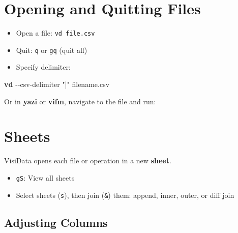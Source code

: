 \documentclass[
  letterpaper,
  DIV=11,
  numbers=noendperiod]{scrartcl}
\newenvironment{Shaded}{}{}
\newcommand{\AttributeTok}[1]{\textcolor[rgb]{0.65,0.15,0.64}{#1}}
\newcommand{\BuiltInTok}[1]{\textcolor[rgb]{0.65,0.15,0.64}{#1}}
\newcommand{\CommentTok}[1]{\textcolor[rgb]{0.63,0.63,0.65}{\textit{#1}}}
\newcommand{\ExtensionTok}[1]{\textcolor[rgb]{0.25,0.47,0.95}{\textbf{#1}}}
\newcommand{\NormalTok}[1]{\textcolor[rgb]{0.22,0.23,0.26}{#1}}
\newcommand{\StringTok}[1]{\textcolor[rgb]{0.31,0.63,0.31}{#1}}
\newcommand{\VariableTok}[1]{\textcolor[rgb]{0.89,0.34,0.29}{#1}}
\providecommand{\tightlist}{%
  \setlength{\itemsep}{0pt}\setlength{\parskip}{0pt}}\usepackage{longtable,booktabs,array}
\begin{document}
\section{Opening and Quitting Files}\label{opening-and-quitting-files}

\begin{itemize}
\tightlist
\item
  Open a file: \texttt{vd\ file.csv}
\item
  Quit: \texttt{q} or \texttt{gq} (quit all)
\item
  Specify delimiter:
\end{itemize}

\begin{Shaded}
\begin{Highlighting}[]
\ExtensionTok{vd} \AttributeTok{{-}{-}csv{-}delimiter} \StringTok{"|"}\NormalTok{ filename.csv}
\end{Highlighting}
\end{Shaded}

Or in \textbf{yazi} or \textbf{vifm}, navigate to the file and run:

\begin{Shaded}
\end{Shaded}

\section{Sheets}\label{sheets}

VisiData opens each file or operation in a new \textbf{sheet}.

\begin{itemize}
\tightlist
\item
  \texttt{gS}: View all sheets
\item
  Select sheets (\texttt{s}), then join (\texttt{\&}) them: append,
  inner, outer, or diff join
\end{itemize}

\subsection{Adjusting Columns}\label{adjusting-columns}
\end{document}
